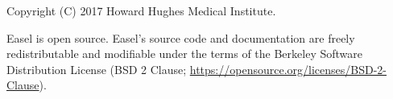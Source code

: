 \vspace*{\fill}
\begin{flushleft}
Copyright (C) 2017 Howard Hughes Medical Institute.

\vspace{2em} 

Easel is open source.  Easel's source code and documentation are
freely redistributable and modifiable under the terms of the Berkeley
Software Distribution License (BSD 2 Clause;
\url{https://opensource.org/licenses/BSD-2-Clause}).

\end{flushleft}








